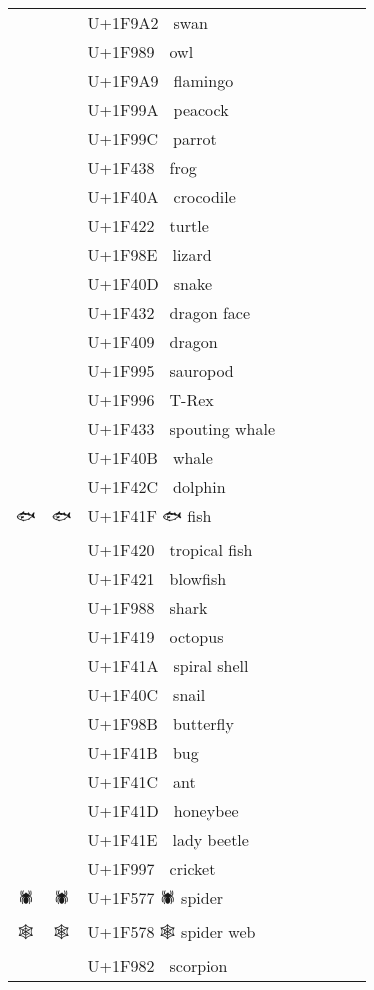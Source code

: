 \documentclass[a4paper,12pt]{ltjarticle}
\newcommand{\fontA}[1]{{\fontspec[RawFeature={mode=harf,+dist,+ccmp}]{Segoe UI Emoji} #1}}
\newcommand{\fontB}[1]{{\fontspec[RawFeature={mode=harf,+dist,+ccmp}]{Noto Color Emoji} #1}}
\begin{document}
\begin{longtable}[c]{ccp{0.8\linewidth}}
\fontA{🦢}&\fontB{🦢}&U+1F9A2 🦢 swan\\
\fontA{🦉}&\fontB{🦉}&U+1F989 🦉 owl\\
\fontA{🦩}&\fontB{🦩}&U+1F9A9 🦩 flamingo\\
\fontA{🦚}&\fontB{🦚}&U+1F99A 🦚 peacock\\
\fontA{🦜}&\fontB{🦜}&U+1F99C 🦜 parrot\\
\fontA{🐸}&\fontB{🐸}&U+1F438 🐸 frog\\
\fontA{🐊}&\fontB{🐊}&U+1F40A 🐊 crocodile\\
\fontA{🐢}&\fontB{🐢}&U+1F422 🐢 turtle\\
\fontA{🦎}&\fontB{🦎}&U+1F98E 🦎 lizard\\
\fontA{🐍}&\fontB{🐍}&U+1F40D 🐍 snake\\
\fontA{🐲}&\fontB{🐲}&U+1F432 🐲 dragon face\\
\fontA{🐉}&\fontB{🐉}&U+1F409 🐉 dragon\\
\fontA{🦕}&\fontB{🦕}&U+1F995 🦕 sauropod\\
\fontA{🦖}&\fontB{🦖}&U+1F996 🦖 T-Rex\\
\fontA{🐳}&\fontB{🐳}&U+1F433 🐳 spouting whale\\
\fontA{🐋}&\fontB{🐋}&U+1F40B 🐋 whale\\
\fontA{🐬}&\fontB{🐬}&U+1F42C 🐬 dolphin\\
\fontA{🐟}&\fontB{🐟}&U+1F41F 🐟 fish\\
\fontA{🐠}&\fontB{🐠}&U+1F420 🐠 tropical fish\\
\fontA{🐡}&\fontB{🐡}&U+1F421 🐡 blowfish\\
\fontA{🦈}&\fontB{🦈}&U+1F988 🦈 shark\\
\fontA{🐙}&\fontB{🐙}&U+1F419 🐙 octopus\\
\fontA{🐚}&\fontB{🐚}&U+1F41A 🐚 spiral shell\\
\fontA{🐌}&\fontB{🐌}&U+1F40C 🐌 snail\\
\fontA{🦋}&\fontB{🦋}&U+1F98B 🦋 butterfly\\
\fontA{🐛}&\fontB{🐛}&U+1F41B 🐛 bug\\
\fontA{🐜}&\fontB{🐜}&U+1F41C 🐜 ant\\
\fontA{🐝}&\fontB{🐝}&U+1F41D 🐝 honeybee\\
\fontA{🐞}&\fontB{🐞}&U+1F41E 🐞 lady beetle\\
\fontA{🦗}&\fontB{🦗}&U+1F997 🦗 cricket\\
\fontA{🕷}&\fontB{🕷}&U+1F577 🕷 spider\\
\fontA{🕸}&\fontB{🕸}&U+1F578 🕸 spider web\\
\fontA{🦂}&\fontB{🦂}&U+1F982 🦂 scorpion\\

\end{longtable}
\end{document}
